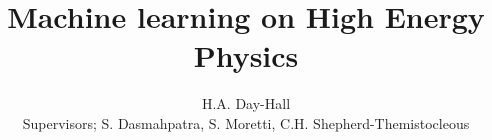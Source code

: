 \documentclass{article}
\begin{document}
\title{Machine learning on High Energy Physics}
\author{H.A. Day-Hall \\ {\small Supervisors; S. Dasmahpatra, S. Moretti, C.H. Shepherd-Themistocleous}}
	
	\maketitle
	
	\tableofcontents
    \FloatBarrier
     
    \FloatBarrier
    
    
    \FloatBarrier
    \FloatBarrier
    
    \FloatBarrier
    
    \FloatBarrier
    
    \FloatBarrier
    
    \FloatBarrier
    
    \FloatBarrier
    
    \FloatBarrier
    
    
    \printbibliography	
\end{document}
